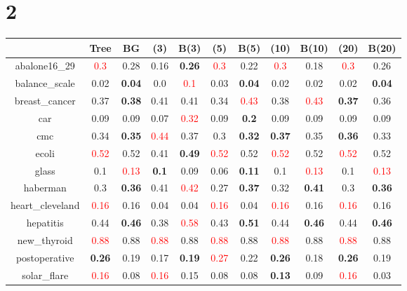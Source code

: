 \documentclass{article}%
\begin{document}
\section*{2}%
\begin{tabular}{c|cccccccccc}%
\hline%
&Tree&BG&(3)&B(3)&(5)&B(5)&(10)&B(10)&(20)&B(20)\\%
\hline%
abalone16\_29&\textcolor{red}{ 
0.3
}&0.28&0.16&\textbf{0.26}&\textcolor{red}{ 
0.3
}&0.22&\textcolor{red}{ 
0.3
}&0.18&\textcolor{red}{ 
0.3
}&0.26\\%
\hline%
balance\_scale&0.02&\textbf{0.04}&0.0&\textcolor{red}{ 
0.1
}&0.03&\textbf{0.04}&0.02&0.02&0.02&\textbf{0.04}\\%
\hline%
breast\_cancer&0.37&\textbf{0.38}&0.41&0.41&0.34&\textcolor{red}{ 
0.43
}&0.38&\textcolor{red}{ 
0.43
}&\textbf{0.37}&0.36\\%
\hline%
car&0.09&0.09&0.07&\textcolor{red}{ 
0.32
}&0.09&\textbf{0.2}&0.09&0.09&0.09&0.09\\%
\hline%
cmc&0.34&\textbf{0.35}&\textcolor{red}{ 
0.44
}&0.37&0.3&\textbf{0.32}&\textbf{0.37}&0.35&\textbf{0.36}&0.33\\%
\hline%
ecoli&\textcolor{red}{ 
0.52
}&0.52&0.41&\textbf{0.49}&\textcolor{red}{ 
0.52
}&0.52&\textcolor{red}{ 
0.52
}&0.52&\textcolor{red}{ 
0.52
}&0.52\\%
\hline%
glass&0.1&\textcolor{red}{ 
0.13
}&\textbf{0.1}&0.09&0.06&\textbf{0.11}&0.1&\textcolor{red}{ 
0.13
}&0.1&\textcolor{red}{ 
0.13
}\\%
\hline%
haberman&0.3&\textbf{0.36}&0.41&\textcolor{red}{ 
0.42
}&0.27&\textbf{0.37}&0.32&\textbf{0.41}&0.3&\textbf{0.36}\\%
\hline%
heart\_cleveland&\textcolor{red}{ 
0.16
}&0.16&0.04&0.04&\textcolor{red}{ 
0.16
}&0.04&\textcolor{red}{ 
0.16
}&0.16&\textcolor{red}{ 
0.16
}&0.16\\%
\hline%
hepatitis&0.44&\textbf{0.46}&0.38&\textcolor{red}{ 
0.58
}&0.43&\textbf{0.51}&0.44&\textbf{0.46}&0.44&\textbf{0.46}\\%
\hline%
new\_thyroid&\textcolor{red}{ 
0.88
}&0.88&\textcolor{red}{ 
0.88
}&0.88&\textcolor{red}{ 
0.88
}&0.88&\textcolor{red}{ 
0.88
}&0.88&\textcolor{red}{ 
0.88
}&0.88\\%
\hline%
postoperative&\textbf{0.26}&0.19&0.17&\textbf{0.19}&\textcolor{red}{ 
0.27
}&0.22&\textbf{0.26}&0.18&\textbf{0.26}&0.19\\%
\hline%
solar\_flare&\textcolor{red}{ 
0.16
}&0.08&\textcolor{red}{ 
0.16
}&0.15&0.08&0.08&\textbf{0.13}&0.09&\textcolor{red}{ 
0.16
}&0.03\\%

\end{tabular}
\end{document}
